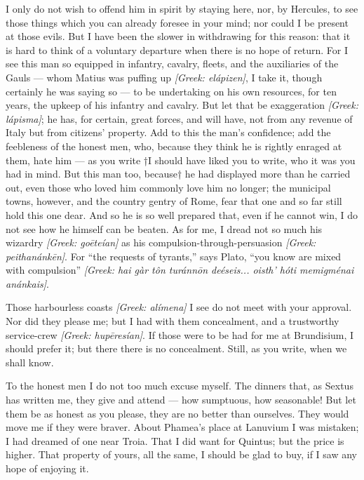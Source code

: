  I only do not wish to offend him in spirit by staying here, nor, by Hercules, to see those things which you can already foresee in your mind; nor could I be present at those evils. But I have been the slower in withdrawing for this reason: that it is hard to think of a voluntary departure when there is no hope of return. For I see this man so equipped in infantry, cavalry, fleets, and the auxiliaries of the Gauls --- whom Matius was puffing up \textit{[Greek: el\'apizen]}, I take it, though certainly he was saying so --- to be undertaking on his own resources, for ten years, the upkeep of his infantry and cavalry. But let that be exaggeration \textit{[Greek: l\'apisma]}; he has, for certain, great forces, and will have, not from any revenue of Italy but from citizens' property. Add to this the man's confidence; add the feebleness of the honest men, who, because they think he is rightly enraged at them, hate him --- as you write †I should have liked you to write, who it was you had in mind. But this man too, because† he had displayed more than he carried out, even those who loved him commonly love him no longer; the municipal towns, however, and the country gentry of Rome, fear that one and so far still hold this one dear. And so he is so well prepared that, even if he cannot win, I do not see how he himself can be beaten. As for me, I dread not so much his wizardry \textit{[Greek: go\=ete\'ian]} as his compulsion-through-persuasion \textit{[Greek: peithan\'ank\=en]}. For ``the requests of tyrants,'' says Plato, ``you know are mixed with compulsion'' \textit{[Greek: hai g\`ar t\^on tur\'ann\=on de\'eseis... oisth' h\'oti memigm\'enai an\'ankais]}.

 Those harbourless coasts \textit{[Greek: al\'imena]} I see do not meet with your approval. Nor did they please me; but I had with them concealment, and a trustworthy service-crew \textit{[Greek: hup\=eres\'ian]}. If those were to be had for me at Brundisium, I should prefer it; but there there is no concealment. Still, as you write, when we shall know.

 To the honest men I do not too much excuse myself. The dinners that, as Sextus has written me, they give and attend --- how sumptuous, how seasonable! But let them be as honest as you please, they are no better than ourselves. They would move me if they were braver. About Phamea's place at Lanuvium I was mistaken; I had dreamed of one near Troia. That I did want for Quintus; but the price is higher. That property of yours, all the same, I should be glad to buy, if I saw any hope of enjoying it.


